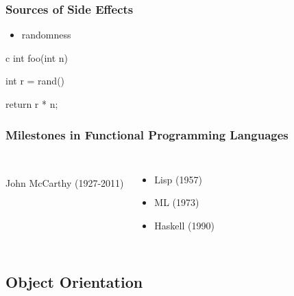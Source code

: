 \documentclass[dvipsnames]{beamer}
\theoremstyle{plain}
\begin{document}
\begin{frame}[fragile]
  \frametitle{Sources of Side Effects}

  \begin{itemize}
    \item randomness
  \end{itemize}

  \begin{example}
    \begin{pygments}[]{c}
int foo(int n)
{
    int r = rand() %

    return r * n;
}
    \end{pygments}
  \end{example}
\end{frame}

\begin{frame}
  \frametitle{Milestones in Functional Programming Languages}

  \begin{columns}
    \begin{center}
      \\
      John McCarthy (1927-2011)
    \end{center}

    \begin{itemize}
      \item Lisp (1957)
      \item ML (1973)
      \item Haskell (1990)
    \end{itemize}
  \end{columns}
\end{frame}

\subsection{Object Orientation}
\end{document}
